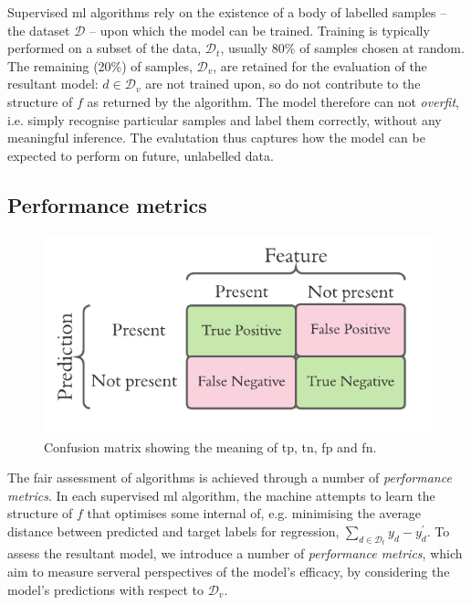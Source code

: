 \par 

Supervised \gls{ml} algorithms rely on the existence of a body of labelled samples 
    -- the dataset $\mathcal{D}$ -- upon which the model can be trained.
Training is typically performed on a subset of the data, $\mathcal{D}_t$, usually 80\% of samples chosen at random. 
The remaining (20\%) of samples, $\mathcal{D}_v$, are retained for the evaluation of the resultant model: 
    $d \in \mathcal{D}_v$ are not trained upon, so do not contribute to the structure of $f$ as returned by the algorithm.
    The model therefore can not \emph{overfit}, i.e. simply recognise particular samples and label them correctly,
    without any meaningful inference. 
The evalutation thus captures how the model can be expected to perform on future, unlabelled data. 
\par 

\subsection{Performance metrics}\label{sec:performance_metrics}
\begin{figure}
    \begin{center}
        \includegraphics{contextual_review/figures/confusion_matrix.pdf}
    \end{center}
    \caption[Confusion matrix]{
        Confusion matrix showing the meaning of 
        \acrlong{tp}, \acrlong{tn}, \acrlong{fp} and \acrlong{fn}.
    }
    \label{fig:confusion_matrix}
\end{figure}
The fair assessment of algorithms is achieved through a number of \emph{performance metrics}.
In each supervised \gls{ml} algorithm, the machine attempts to learn the structure of $f$ that optimises some internal \gls{of}, 
    e.g. minimising the average distance between predicted and target labels for regression, $\sum\limits_{d \in \mathcal{D}_t} y_d - y^{\prime}_d$.
To assess the resultant model, we introduce a number of \emph{performance metrics}, 
    which aim to measure serveral perspectives of the model's efficacy, by considering the model's predictions with respect to $\mathcal{D}_v$. 
\par 

